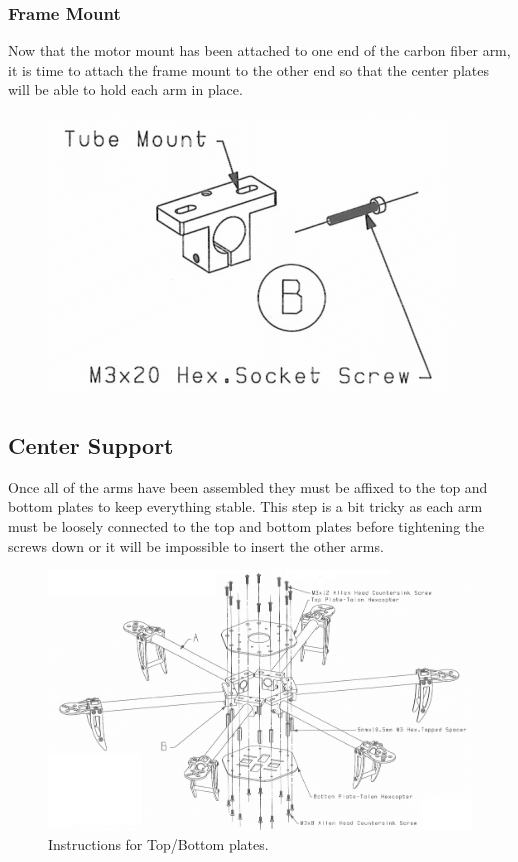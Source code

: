 \documentclass[10pt,notitlepage]{article}
\begin{document}
\subsubsection{Frame Mount}
Now that the motor mount has been attached to one end of the carbon fiber arm, it is time to attach the frame mount to the other end so that the center plates will be able to hold each arm in place.
\begin{figure}[H]
	\centering
	\includegraphics{Images/ArmInner.png}
\end{figure}

\subsection{Center Support}
Once all of the arms have been assembled they must be affixed to the top and bottom plates to keep everything stable. This step is a bit tricky as each arm must be loosely connected to the top and bottom plates before tightening the screws down or it will be impossible to insert the other arms.

\begin{figure}[H]
	\centering
	\includegraphics[width=\textwidth]{Images/CenterConsole.png}
	\caption{Instructions for Top/Bottom plates.}
\end{figure}
\end{document}
